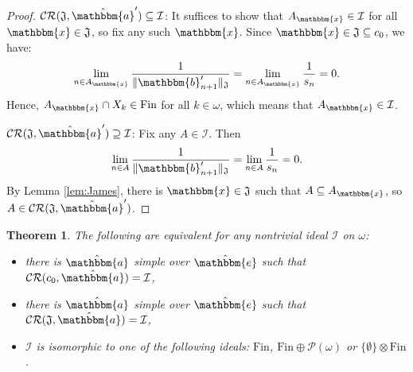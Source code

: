 \documentclass{amsart}
\newcommand{\I}{\mathcal{I}}
\newcommand{\Fin}{\mathrm{Fin}}
\newcommand{\CR}{\mathcal{CR}}
\newcommand{\w}{\mathbbm}
\newtheorem{theorem}{Theorem}[section]
\begin{document}
\begin{proof}
$\CR(\mathfrak{J},\hat{\w{a}}')\subseteq\I$: It suffices to show that $A_{\w{x}}\in\I$ for all $\w{x}\in \mathfrak{J}$, so fix any such $\w{x}$. Since $\w{x}\in \mathfrak{J}\subseteq c_0$, we have: 
\[
\lim_{n\in A_{\w{x}}}\frac{1}{\|\w{b}'_{n+1}\|_{\mathfrak{J}}}=\lim_{n\in A_{\w{x}}}\frac{1}{s_n}=0.
\]
Hence, $A_{\w{x}}\cap X_k\in\Fin$ for all $k\in\omega$, which means that $A_{\w{x}}\in\I$.

$\CR(\mathfrak{J},\hat{\w{a}}')\supseteq\I$: Fix any $A\in\I$. Then
\[
\lim_{n\in A}\frac{1}{\|\w{b}'_{n+1}\|_{\mathfrak{J}}}=\lim_{n\in A}\frac{1}{s_n}=0.
\]
By Lemma \ref{lem:James}, there is  $\w{x}\in \mathfrak{J}$ such that $A\subseteq A_{\w{x}}$, so $A\in \CR(\mathfrak{J},\hat{\w{a}}')$.
\end{proof}

\begin{theorem}
\label{char:c_0}
The following are equivalent for any nontrivial ideal $\I$ on $\omega$:
\begin{itemize}
    \item[(a)] there is $\hat{\w{a}}$ simple over $\hat{\w{e}}$ such that $\CR(c_0,\hat{\w{a}})=\I$,
    \item[(b)] there is $\hat{\w{a}}$ simple over $\hat{\w{e}}$ such that $\CR(\mathfrak{J},\hat{\w{a}})=\I$,
    \item[(c)] $\I$ is isomorphic to one of the following ideals: $\Fin$, $\Fin\oplus\mathcal{P}(\omega)$ or $\{\emptyset\}\otimes\Fin$.
\end{itemize}
\end{theorem}
\end{document}
